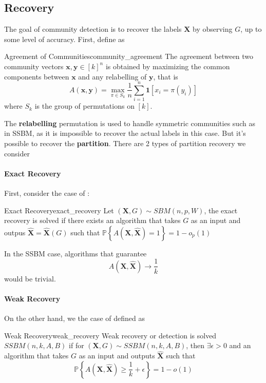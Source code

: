 \documentclass[twoside]{article}
\begin{document}
\subsection{Recovery}
The goal of community detection is to recover the labels $\mathbf{X}$ by observing $G$, up to some level of accuracy. First, define  as 
\begin{definition}{Agreement of Communities}{community_agreement}
    The agreement between two community vectors $\mathbf{x,y}\in [k]^n$ is obtained by maximizing the common components between $\mathbf{x}$ and any relabelling of $\mathbf{y}$, that is 
    \begin{equation*}
        A(\mathbf{x,y}) = \max_{\pi\in S_k}\frac{1}{n}\sum^n_{i=1}\mathbf{1}\left[x_i = \pi(y_i)\right]
    \end{equation*}
    where $S_k$ is the group of permutations on $[k]$.
\end{definition}
The \textbf{relabelling} permutation is used to handle symmetric communities such as in SSBM, as it is impossible to recover the actual labels in this case.
But it's possible to recover the \textbf{partition}. There are 2 types of partition recovery we consider 

\paragraph*{Exact Recovery} 
First, consider the case of :
\begin{definition}{Exact Recovery}{exact_recovery}
   Let $(\mathbf{X},G)\sim SBM(n,p,W)$, the exact recovery is solved if there exists an algorithm that takes $G$ as an input and outpus $\hat{\mathbf{X}} = \hat{\mathbf{X}}(G)$ such that $\mathbb{P}\left\{ A(\mathbf{X},\hat{\mathbf{X}}) =1 \right\} = 1-o_p(1)$ 
\end{definition}
In the SSBM case, algorithms that guarantee $$A(\mathbf{X},\hat{\mathbf{X}}) \rightarrow \frac{1}{k}$$ would be trivial.

\paragraph*{Weak Recovery} 
On the other hand, we the case of  defined as 
\begin{definition}{Weak Recovery}{weak_recovery}
    Weak recovery or detection is solved $SSBM(n,k,A,B)$ if for $(\mathbf{X},G)\sim SSBM(n,k,A,B)$, then $\exists \epsilon >0 $ and an algorithm that takes $G$ as an input and outputs $\hat{\mathbf{X}}$ such that 
    $$
    \mathbb{P}\left\{ A(\mathbf{X},\hat{\mathbf{X}})\geq \frac{1}{k} + \epsilon \right\} = 1-o(1)
    $$
\end{definition}
\end{document}
